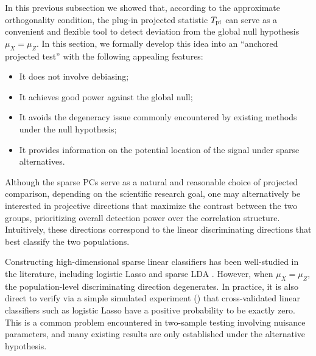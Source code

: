 \documentclass[11pt]{article}
\begin{document}
In this previous subsection we showed that, according to the approximate orthogonality condition, the plug-in projected statistic $T_{\rm pi}$ can serve as a convenient and flexible tool to detect deviation from the global null hypothesis $\mu_X=\mu_Z$. In this section, we formally develop this idea into an ``anchored projected test'' with the following appealing features:
\begin{itemize}
    \item It does not involve debiasing; 
    \item It achieves good power against the global null;
    \item It avoids the degeneracy issue commonly encountered by existing methods under the null hypothesis;
    \item It provides information on the potential location of the signal under sparse alternatives.
\end{itemize}

Although the sparse PCs serve as a natural and reasonable choice of projected comparison,
depending on the scientific research goal, one may alternatively be interested in projective directions that maximize the contrast between the two groups, prioritizing overall detection power over the correlation structure. Intuitively, these directions correspond to the linear discriminating directions that best classify the two populations.

Constructing high-dimensional sparse linear classifiers has been well-studied in the literature, including logistic Lasso \citep{tibshirani1996regression,van2008high} and sparse LDA \citep{cai2011direct}. However, when $\mu_X = \mu_Z$, the population-level discriminating direction degenerates. In practice, it is also direct to verify via a simple simulated experiment () that cross-validated linear classifiers such as logistic Lasso have a positive probability to be exactly zero. This is a common problem encountered in two-sample testing involving nuisance parameters, and many existing results \cite{liu2022multiple} are only established under the alternative hypothesis. 
\end{document}
